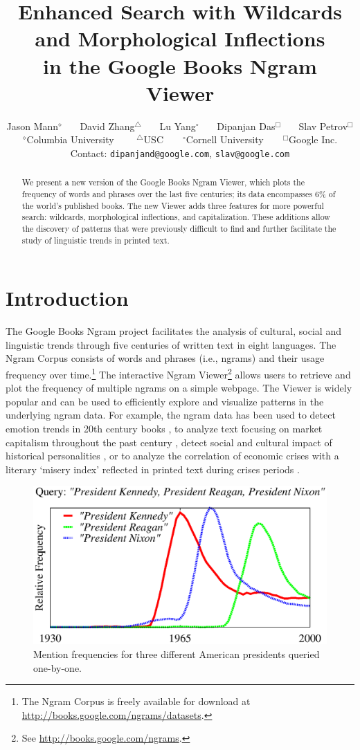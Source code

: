 \documentclass[11pt,a4paper]{article}
\title{Enhanced Search with Wildcards and Morphological Inflections\\in the Google Books Ngram Viewer}
\author{Jason Mann$^\diamond$ \ \ \ David Zhang$^\triangle$ \ \ \ Lu Yang$^\circ$ \ \ \ Dipanjan Das$^\Box$ \ \ \ Slav Petrov$^\Box$\\
	$^\diamond$Columbia University \ \ \ \ $^\triangle$USC\ \ \ \ $^\circ$Cornell University\ \ \ \ $^\Box$Google Inc.\\
	Contact: \texttt{dipanjand@google.com}, \texttt{slav@google.com}\\}
\date{}
\begin{document}
\maketitle

\begin{abstract}

We present a new version of the Google Books Ngram Viewer, which plots
the frequency of words and phrases over the last five
centuries; its data encompasses 6\% of the world's published books.
The new Viewer adds three features for more powerful search: wildcards,
morphological inflections, and capitalization. These additions allow
the discovery of patterns that were previously difficult to find
and further facilitate the study of linguistic trends in printed text.

\end{abstract}

\section{Introduction}

The Google Books Ngram project facilitates the analysis of cultural, social and linguistic trends through five centuries of written text in eight languages. The Ngram Corpus \cite{culturomics,lin2012syntactic} consists of words and phrases (i.e., ngrams) and their usage frequency over time.\footnote{The Ngram Corpus is freely available for download at \url{http://books.google.com/ngrams/datasets}.} The interactive Ngram Viewer\footnote{See \url{http://books.google.com/ngrams}.} allows users to retrieve and plot the frequency of multiple ngrams on a simple webpage. The Viewer is widely popular and can be used to efficiently explore and visualize patterns in the underlying ngram data. For example, the ngram data has been used to detect emotion trends in 20th century books \cite{acerbi.etal.2013}, to analyze text focusing on market capitalism throughout the past century \cite{Schulz2013}, detect social and cultural impact of historical personalities \cite{skiena.ward.2013}, or to analyze the correlation of economic crises with a literary `misery index' reflected in printed text during crises periods \cite{bentley.et.al.2014}.

\begin{figure}[t]
\includegraphics[width=\columnwidth]{graphs/kenreanixon}
\vspace*{-1.5em}
\caption{\label{fig:manual}Mention frequencies for three different American presidents queried one-by-one.}
\end{figure}
\end{document}
